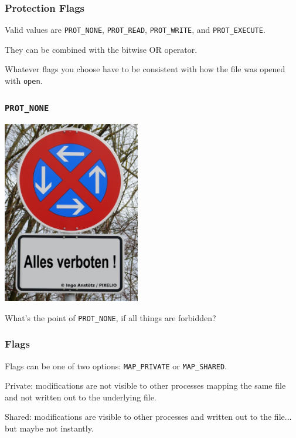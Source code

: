 \begin{frame}
	\frametitle{Protection Flags}

	Valid values are \texttt{PROT\_NONE}, \texttt{PROT\_READ}, \texttt{PROT\_WRITE}, and \texttt{PROT\_EXECUTE}.

	They can be combined with the bitwise OR operator.

	Whatever flags you choose have to be consistent with how the file was opened with \texttt{open}.

\end{frame}


\begin{frame}
	\frametitle{\texttt{PROT\_NONE}}

	\begin{center}
		\includegraphics[width=0.45\textwidth]{images/AllesVerboten.jpg}
	\end{center}

	What's the point of \texttt{PROT\_NONE}, if all things are forbidden?

\end{frame}


\begin{frame}
	\frametitle{Flags}
	Flags can be one of two options: \texttt{MAP\_PRIVATE} or \texttt{MAP\_SHARED}.

	Private: modifications are not visible to other processes mapping the same file and not written out to the underlying file.

	Shared: modifications are visible to other processes and written out to the file... but maybe not instantly.

\end{frame}


